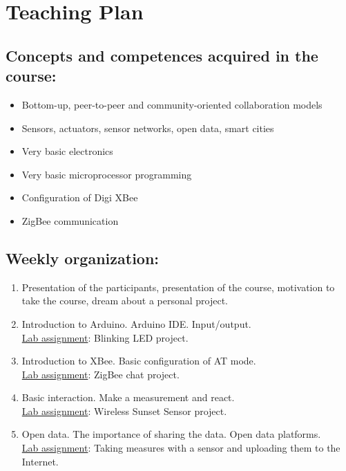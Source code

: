 \documentclass[oneside]{book}   %
\begin{document}

\chapter{Teaching Plan}

\section{Concepts and competences acquired in the course:}
\begin{itemize}
\item Bottom-up, peer-to-peer and community-oriented collaboration models
\item Sensors, actuators, sensor networks, open data, smart cities
\item Very basic electronics
\item Very basic microprocessor programming
\item Configuration of Digi XBee
\item ZigBee communication
\end{itemize}


\section{Weekly organization:}
\begin{enumerate}
\item Presentation of the participants, presentation of the course, motivation to take the course, dream about a personal project.
\item Introduction to Arduino. Arduino IDE. Input/output. \\\underline{Lab assignment}: Blinking LED project.
\item Introduction to XBee. Basic configuration of AT mode. \\\underline{Lab assignment}: ZigBee chat project.
\item Basic interaction. Make a measurement and react. \\\underline{Lab assignment}: Wireless Sunset Sensor project.
\item Open data. The importance of sharing the data. Open data platforms. \\\underline{Lab assignment}: Taking measures with a sensor and uploading them to the Internet.
\end{enumerate}
\end{document}

